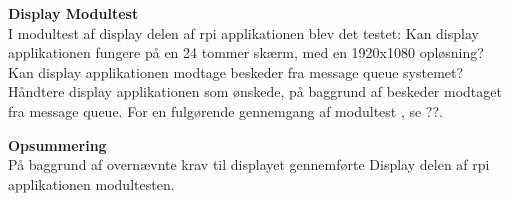 \documentclass[Modultest/Modultest_main.tex]{subfiles}
\begin{document}
\textbf{Display Modultest}\\
I modultest af display delen af rpi applikationen blev det testet:  Kan display applikationen fungere på en 24 tommer skærm, med en 1920x1080 opløsning? Kan display applikationen modtage beskeder fra message queue systemet? Håndtere display applikationen som ønskede, på baggrund af beskeder modtaget fra message queue. For en fulgørende gennemgang af modultest , se ??. 

\textbf{Opsummering}\\
På baggrund af overnævnte krav til displayet gennemførte Display delen af rpi applikationen  modultesten. 
\end{document}
